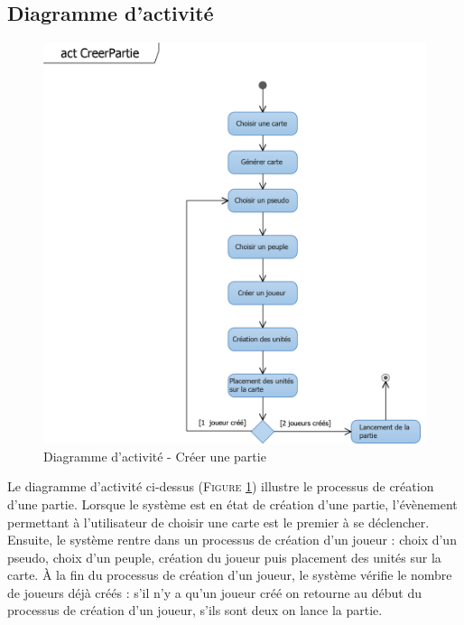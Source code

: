 \documentclass[a4paper,11pt]{article}
\begin{document}
	\subsection{Diagramme d'activité}
		\vspace*{0.5cm}
		\begin{figure}[ht!]
			\includegraphics{Diagrammes/Creation/actCreerPartie.png}
			\caption{Diagramme d'activité - Créer une partie}
			\label{fig:actcreer}
		\end{figure}
		\vspace*{1cm}
		Le diagramme d'activité ci-dessus (\textsc{Figure \ref{fig:actcreer}}) illustre le processus de création d'une partie. Lorsque le système est en état de création d'une partie, l'évènement permettant à l'utilisateur de choisir une carte est le premier à se déclencher. Ensuite, le système rentre dans un processus de création d'un joueur : choix d'un pseudo, choix d'un peuple, création du joueur puis placement des unités sur la carte. À la fin du processus de création d'un joueur, le système vérifie le nombre de joueurs déjà créés : s'il n'y a qu'un joueur créé on retourne au début du processus de création d'un joueur, s'ils sont deux on lance la partie.
		\newpage
\end{document}
